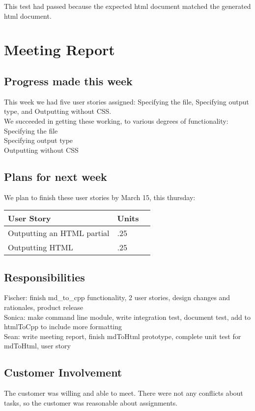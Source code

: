 \documentclass[12pt]{article}
\begin{document}
This test had passed because the expected html document matched the generated html document.  
 \section{Meeting Report}

\subsection{Progress made this week}
This week we had five user stories assigned: Specifying the file, Specifying output type, and Outputting without CSS.\\
We succeeded in getting these working, to various degrees of functionality: \\
Specifying the file\\
Specifying output type\\
Outputting without CSS\\



\subsection{Plans for next week}
We plan to finish these user stories by March 15, this thursday:

 \begin{center}
    \begin{tabular}{ | l | l | p{5cm} |}
    \hline
    User Story & Units \\ \hline
    Outputting an HTML partial & .25 \\ \hline
    Outputting HTML & .25 \\ \hline
    \end{tabular}
\end{center}


\subsection{Responsibilities}
Fischer: finish md\_to\_cpp functionality, 2 user stories, design changes and rationales, product release  \\
Sonica: make command line module, write integration test, document test, add to htmlToCpp to include more formatting\\
Sean: write meeting report, finish mdToHtml prototype, complete unit test for mdToHtml, user story\\

\subsection{Customer Involvement}
The customer was willing and able to meet.
There were not any conflicts about tasks, so the customer was reasonable about assignments.

 
\end{document}
